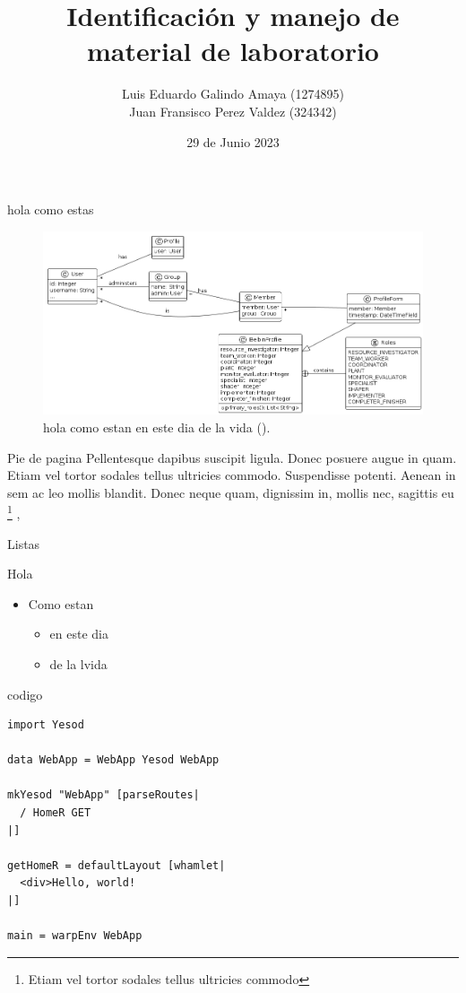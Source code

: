 \documentclass[9pt]{beamer}
\author{Luis Eduardo Galindo Amaya (1274895) \\
Juan Fransisco Perez Valdez  (324342)}
\date{29 de Junio 2023}
\title{Identificación y manejo de \\
material de laboratorio}
\begin{document}
\maketitle

\begin{frame}[label={sec:org070d2a5}]{hola como estas}
\begin{figure}[htbp]
\centering
\includegraphics[width=.9\linewidth]{./a.png}
\caption{hola como estan en este dia de la vida (\cite{einstein}).}
\end{figure}
\end{frame}

\begin{frame}[label={sec:org34b459b}]{Pie de pagina}
Pellentesque dapibus suscipit ligula.  Donec posuere augue in quam.  Etiam vel
tortor sodales tellus ultricies commodo.  Suspendisse potenti.  Aenean in sem 
ac leo mollis blandit.  Donec neque quam, dignissim in, mollis nec, sagittis eu \footnote{Etiam vel tortor sodales tellus ultricies commodo} ,
\end{frame}


\begin{frame}[label={sec:org477200d}]{Listas}
\begin{block}{Hola}
\begin{itemize}
\item Como estan
\begin{itemize}
\item en este dia
\item de la lvida
\end{itemize}
\end{itemize}
\end{block}
\end{frame}

\begin{frame}[label={sec:orge091e4d},fragile]{codigo}
 \begin{verbatim}
import Yesod

data WebApp = WebApp Yesod WebApp

mkYesod "WebApp" [parseRoutes|
  / HomeR GET
|]

getHomeR = defaultLayout [whamlet|
  <div>Hello, world!
|]

main = warpEnv WebApp

\end{verbatim}
\end{frame}
\end{document}
